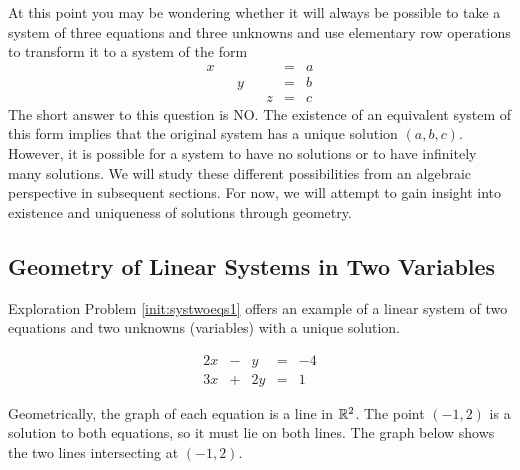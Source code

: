 \documentclass{ximera}
\begin{document}
At this point you may be wondering whether it will always be possible to take a system of three equations and three unknowns and use elementary row operations to transform it to a system of the form
$$\begin{array}{ccccccc}
      x & &&&&= &a \\
	 & &y&&&=&b\\
     & &&&z&=&c
    \end{array}$$
The short answer to this question is NO.  The existence of an equivalent system of this form implies that the original system has a unique solution $(a, b, c)$.  However, it is possible for a system to have no solutions or to have infinitely many solutions.  We will study these different possibilities from an algebraic perspective in subsequent sections.  For now, we will attempt to gain insight into existence and uniqueness of solutions through geometry.     

\subsection*{Geometry of Linear Systems in Two Variables}
Exploration Problem \ref{init:systwoeqs1} offers an example of a linear system of two equations and two unknowns (variables) with a unique solution.  

$$\begin{array}{ccccc}
      2x& -&y&=&-4\\
      3x & +&2y&= &1 
    \end{array}$$

Geometrically, the graph of each equation is a line in $\mathbb{R}^2$.  The point $(-1, 2)$ is a solution to both equations, so it must lie on both lines.
  The graph below shows the two lines intersecting at $(-1, 2)$.    
    
\begin{center}
\end{center}
\end{document}
